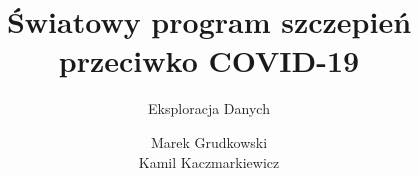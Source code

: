 \documentclass[11pt]{beamer}
\author{Marek Grudkowski \\ Kamil Kaczmarkiewicz}
\title{Światowy program szczepień \\ przeciwko COVID-19}
\subtitle{Eksploracja Danych}
\institute{Politechnika Gdańska}
\date{}
\begin{document}
\begin{frame}
\titlepage
\end{frame}


\begin{frame}{}

\end{frame}
\end{document}

